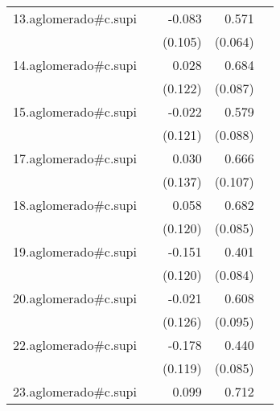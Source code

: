 {\begin{longtable}{l*{4}{D{.}{.}{-1}}}
\addlinespace
13.aglomerado#c.supi&                     &      -0.083         &       0.571\sym{***}&                     \\
            &                     &     (0.105)         &     (0.064)         &                     \\
\addlinespace
14.aglomerado#c.supi&                     &       0.028         &       0.684\sym{***}&                     \\
            &                     &     (0.122)         &     (0.087)         &                     \\
\addlinespace
15.aglomerado#c.supi&                     &      -0.022         &       0.579\sym{***}&                     \\
            &                     &     (0.121)         &     (0.088)         &                     \\
\addlinespace
17.aglomerado#c.supi&                     &       0.030         &       0.666\sym{***}&                     \\
            &                     &     (0.137)         &     (0.107)         &                     \\
\addlinespace
18.aglomerado#c.supi&                     &       0.058         &       0.682\sym{***}&                     \\
            &                     &     (0.120)         &     (0.085)         &                     \\
\addlinespace
19.aglomerado#c.supi&                     &      -0.151         &       0.401\sym{***}&                     \\
            &                     &     (0.120)         &     (0.084)         &                     \\
\addlinespace
20.aglomerado#c.supi&                     &      -0.021         &       0.608\sym{***}&                     \\
            &                     &     (0.126)         &     (0.095)         &                     \\
\addlinespace
22.aglomerado#c.supi&                     &      -0.178         &       0.440\sym{***}&                     \\
            &                     &     (0.119)         &     (0.085)         &                     \\
\addlinespace
23.aglomerado#c.supi&                     &       0.099         &       0.712\sym{***}&                     \\

\end{longtable}}
